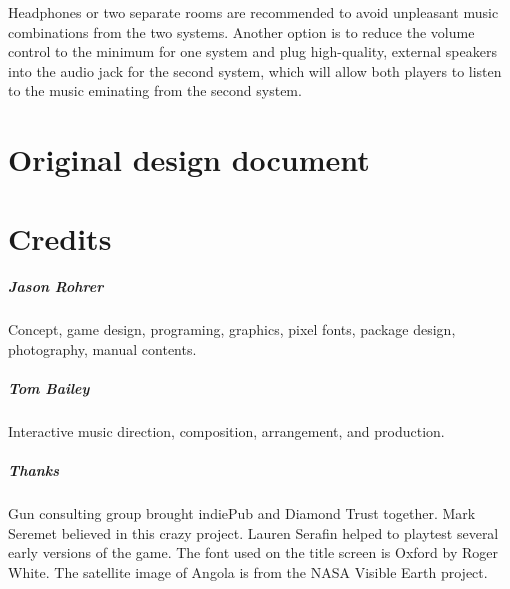 \documentclass[8pt]{extbook}
\begin{document}
Headphones or two separate rooms are recommended to avoid unpleasant music combinations from the two systems.  Another option is to reduce the volume control to the minimum for one system and plug high-quality, external speakers into the audio jack for the second system, which will allow both players to listen to the music eminating from the second system.










\part{Original design document}
\addtocounter{chapter}{1}
\setcounter{section}{0}





\part{Credits}
\addtocounter{chapter}{1}
\setcounter{section}{0}

\subsubsection{Jason Rohrer}
Concept, game design, programing, graphics, pixel fonts, package design, photography, manual contents.

\subsubsection{Tom Bailey}
Interactive music direction, composition, arrangement, and production.

\subsubsection{Thanks}
Gun consulting group brought indiePub and Diamond Trust together.  Mark Seremet believed in this crazy project.  Lauren Serafin helped to playtest several early versions of the game.  The font used on the title screen is Oxford by Roger White.  The satellite image of Angola is from the NASA Visible Earth project.
\end{document}
